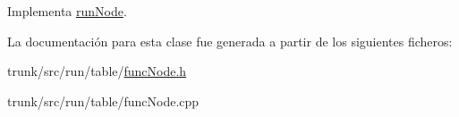 Implementa \hyperlink{classrunNode_a83c10df8148829b08e04153c93d69eec}{run\-Node}.



La documentación para esta clase fue generada a partir de los siguientes ficheros\-:\begin{DoxyCompactItemize}
\item 
trunk/src/run/table/\hyperlink{funcNode_8h}{func\-Node.\-h}\item 
trunk/src/run/table/func\-Node.\-cpp\end{DoxyCompactItemize}
